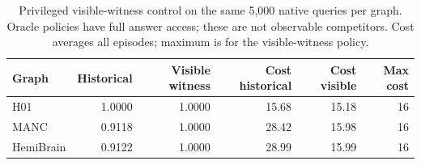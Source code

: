\begin{table}[h]
\centering\small
\caption{Privileged visible-witness control on the same 5,000 native queries per graph. Oracle policies have full answer access; these are not observable competitors. Cost averages all episodes; maximum is for the visible-witness policy.}
\label{tab:review-oracle}
\begin{tabular}{lrrrrr}
\toprule
Graph & Historical & Visible witness & Cost historical & Cost visible & Max cost \\
\midrule
H01 & 1.0000 & 1.0000 & 15.68 & 15.18 & 16 \\
MANC & 0.9118 & 1.0000 & 28.42 & 15.98 & 16 \\
HemiBrain & 0.9122 & 1.0000 & 28.99 & 15.99 & 16 \\
\bottomrule\end{tabular}\end{table}
